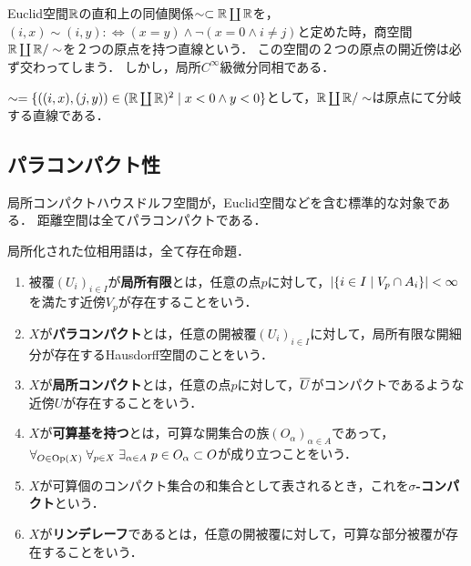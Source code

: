 \documentclass[uplatex,dvipdfmx]{jsreport}
\begin{document}
\begin{example}
    Euclid空間$\mathbb{R}$の直和上の同値関係$\sim\subset\mathbb{R}\coprod\mathbb{R}$を，$(i,x)\sim (i,y):\Leftrightarrow (x=y)\land\lnot(x=0\land i\ne j)$と定めた時，商空間$\mathbb{R}\coprod\mathbb{R}/\sim$を２つの原点を持つ直線という．
    この空間の２つの原点の開近傍は必ず交わってしまう．
    しかし，局所$C^\infty$級微分同相である．
\end{example}

\begin{example}
    $\sim=\{((i,x),(j,y))\in(\mathbb{R}\coprod\mathbb{R})^2\mid x<0\land y<0\}$として，$\mathbb{R}\coprod\mathbb{R}/\sim$は原点にて分岐する直線である．
\end{example}

\subsection{パラコンパクト性}

\begin{tcolorbox}[colframe=ForestGreen, colback=ForestGreen!10!white,breakable,colbacktitle=ForestGreen!40!white,coltitle=black,fonttitle=\bfseries\sffamily,
title=]
    局所コンパクトハウスドルフ空間が，Euclid空間などを含む標準的な対象である．
    距離空間は全てパラコンパクトである．

    局所化された位相用語は，全て存在命題．
\end{tcolorbox}

\begin{definition}[Lindelöf]\mbox{}
    \begin{enumerate}
        \item 被覆$(U_i)_{i\in I}$が\textbf{局所有限}とは，任意の点$p$に対して，$\lvert\left\{i\in I\mid V_p\cap A_i\right\}\rvert<\infty$を満たす近傍$V_p$が存在することをいう．
        \item $X$が\textbf{パラコンパクト}とは，任意の開被覆$(U_i)_{i\in I}$に対して，局所有限な開細分が存在するHausdorff空間のことをいう．
        \item $X$が\textbf{局所コンパクト}とは，任意の点$p$に対して，$\overline{U}$がコンパクトであるような近傍$U$が存在することをいう．
        \item $X$が\textbf{可算基を持つ}とは，可算な開集合の族$(O_\alpha)_{\alpha\in A}$であって，$\forall_{O\in\mathrm{Op}(X)}\;\forall_{p\in X}\;\exists_{\alpha\in A}\;p\in O_\alpha\subset O$が成り立つことをいう．
        \item $X$が可算個のコンパクト集合の和集合として表されるとき，これを\textbf{$\sigma$-コンパクト}という．
        \item $X$が\textbf{リンデレーフ}であるとは，任意の開被覆に対して，可算な部分被覆が存在することをいう．
    \end{enumerate}
\end{definition}
\end{document}
